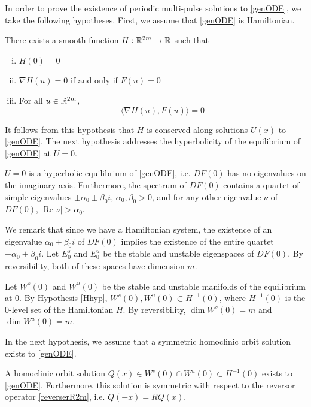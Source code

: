 \documentclass[thesis.tex]{subfiles}
\begin{document}
In order to prove the existence of periodic multi-pulse solutions to \eqref{genODE}, we take the following hypotheses. First, we assume that \eqref{genODE} is Hamiltonian.
\begin{hypothesis}\label{Hhyp}
There exists a smooth function $H: {\mathbb R}^{2m} \rightarrow {\mathbb R}$ such that 
\begin{enumerate}[(i)]
\item $H(0) = 0$
\item $\nabla H(u) = 0$ if and only if $F(u) = 0$
\item For all $u \in {\mathbb R}^{2m}$,
\begin{equation}
\langle \nabla H(u), F(u) \rangle = 0
\end{equation}
\end{enumerate}
\end{hypothesis}
It follows from this hypothesis that $H$ is conserved along solutions $U(x)$ to \eqref{genODE}. The next hypothesis addresses the hyperbolicity of the equilibrium of \eqref{genODE} at $U = 0$.  
\begin{hypothesis}\label{hypeqhyp}
$U = 0$ is a hyperbolic equilibrium of \eqref{genODE}, i.e. $DF(0)$ has no eigenvalues on the imaginary axis. Furthermore, the spectrum of $DF(0)$ contains a quartet of simple eigenvalues $\pm \alpha_0 \pm \beta_0 i$, $\alpha_0, \beta_0 > 0$, and for any other eigenvalue $\nu$ of $DF(0)$, $|\text{Re }\nu| > \alpha_0$.
\end{hypothesis}
We remark that since we have a Hamiltonian system, the existence of an eigenvalue $\alpha_0 + \beta_0 i$ of $DF(0)$ implies the existence of the entire quartet $\pm \alpha_0 \pm \beta_0 i$. Let $E_0^s$ and $E_0^u$ be the stable and unstable eigenspaces of $DF(0)$. By reversibility, both of these spaces have dimension $m$.

Let $W^s(0)$ and $W^u(0)$ be the stable and unstable manifolds of the equilibrium at 0. By Hypothesis \ref{Hhyp}, $W^s(0), W^u(0) \subset H^{-1}(0)$, where $H^{-1}(0)$ is the 0-level set of the Hamiltonian $H$. By reversibility, $\dim W^s(0) = m$ and $\dim W^u(0) = m$. 

In the next hypothesis, we assume that a symmetric homoclinic orbit solution exists to \eqref{genODE}.
\begin{hypothesis}\label{Qexistshyp}
A homoclinic orbit solution $Q(x) \in W^s(0) \cap W^u(0) \subset H^{-1}(0)$ exists to \eqref{genODE}. Furthermore, this solution is symmetric with respect to the reversor operator \eqref{reverserR2m}, i.e. $Q(-x) = R Q(x)$.
\end{hypothesis}
 
\end{document}
